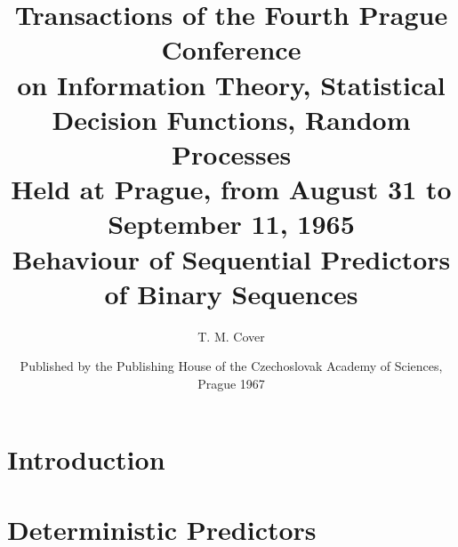 \documentclass[11pt]{article}
\title{
    \Huge Transactions of the Fourth Prague Conference\\
    \Large on Information Theory, Statistical Decision Functions, Random Processes \\
    \large Held at Prague, from August 31 to September 11, 1965 \\
    \vspace{10pt}
    \normalsize Behaviour of Sequential Predictors of Binary Sequences
}
\author{T. M. Cover}
\date{Published by the Publishing House of the Czechoslovak Academy of Sciences, Prague 1967}
\numberwithin{equation}{section}
\theoremstyle{boldStyle}
\begin{document}
\maketitle

\section{Introduction}


\section{Deterministic Predictors}
\end{document}
